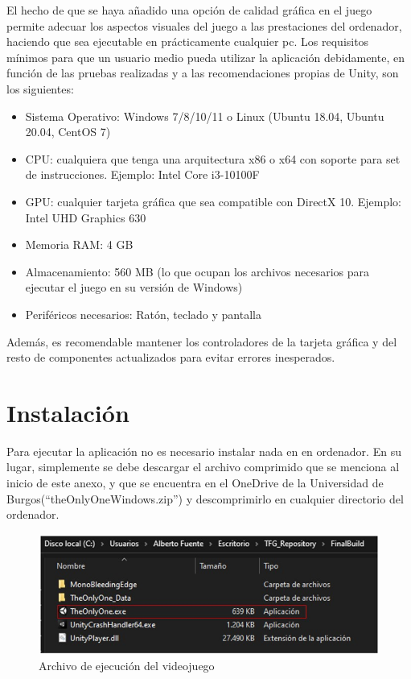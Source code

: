 El hecho de que se haya añadido una opción de calidad gráfica en el juego permite adecuar los aspectos visuales del juego a las prestaciones del ordenador, haciendo que sea ejecutable en prácticamente cualquier pc.
Los requisitos mínimos para que un usuario medio pueda utilizar la aplicación debidamente, en función de las pruebas realizadas y a las recomendaciones propias de Unity, son los siguientes:
\begin{itemize}
    \item Sistema Operativo: Windows 7/8/10/11 o Linux (Ubuntu 18.04, Ubuntu 20.04, CentOS 7)
    \item CPU: cualquiera que tenga una arquitectura x86 o x64 con soporte para set de instrucciones. Ejemplo: Intel Core i3-10100F
    \item GPU: cualquier tarjeta gráfica que sea compatible con DirectX 10. Ejemplo: Intel UHD Graphics 630
    \item Memoria RAM: 4 GB
    \item Almacenamiento: 560 MB (lo que ocupan los archivos necesarios para ejecutar el juego en su versión de Windows)
    \item Periféricos necesarios: Ratón, teclado y pantalla
\end{itemize}
Además, es recomendable mantener los controladores de la tarjeta gráfica y del resto de componentes actualizados para evitar errores inesperados.

\section{Instalación}
Para ejecutar la aplicación no es necesario instalar nada en en ordenador. En su lugar, simplemente se debe descargar el archivo comprimido que se menciona al inicio de este anexo, y que se encuentra en el OneDrive de la Universidad de Burgos(``theOnlyOneWindows.zip'') y descomprimirlo en cualquier directorio del ordenador.

\begin{figure}[h]
    \centering
    \includegraphics[scale=0.45]{img/GameExecution.jpg}
    \caption{Archivo de ejecución del videojuego}
    \label{fig:EjecucionJuego}
    \end{figure}
    
